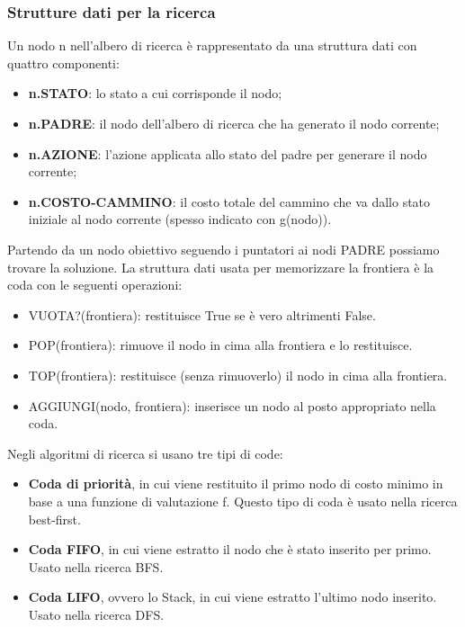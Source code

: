 \documentclass{article}
\begin{document}
\subsubsection{Strutture dati per la ricerca}
Un nodo n nell'albero di ricerca è rappresentato da una struttura dati con quattro componenti:
\begin{itemize}
    \item \textbf{n.STATO}: lo stato a cui corrisponde il nodo;
    \item \textbf{n.PADRE}: il nodo dell'albero di ricerca che ha generato il nodo corrente;
    \item \textbf{n.AZIONE}: l'azione applicata allo stato del padre per generare il nodo corrente;
    \item \textbf{n.COSTO-CAMMINO}: il costo totale del cammino che va dallo stato iniziale al nodo corrente (spesso indicato con g(nodo)).
\end{itemize}
\noindent Partendo da un nodo obiettivo seguendo i puntatori ai nodi PADRE possiamo trovare la soluzione.\newline
La struttura dati usata per memorizzare la frontiera è la coda con le seguenti operazioni:
\begin{itemize}
    \item VUOTA?(frontiera): restituisce True se è vero altrimenti False.
    \item POP(frontiera): rimuove il nodo in cima alla frontiera e lo restituisce.
    \item TOP(frontiera): restituisce (senza rimuoverlo) il nodo in cima alla frontiera.
    \item AGGIUNGI(nodo, frontiera): inserisce un nodo al posto appropriato nella coda.
\end{itemize}
\noindent Negli algoritmi di ricerca si usano tre tipi di code:
\begin{itemize}
    \item \textbf{Coda di priorità}, in cui viene restituito il primo nodo di costo minimo in base a una funzione di valutazione f. Questo tipo di coda è usato nella ricerca best-first.
    \item \textbf{Coda FIFO}, in cui viene estratto il nodo che è stato inserito per primo. Usato nella ricerca BFS.
    \item \textbf{Coda LIFO}, ovvero lo Stack, in cui viene estratto l'ultimo nodo inserito. Usato nella ricerca DFS.
\end{itemize}
\newpage
\end{document}

